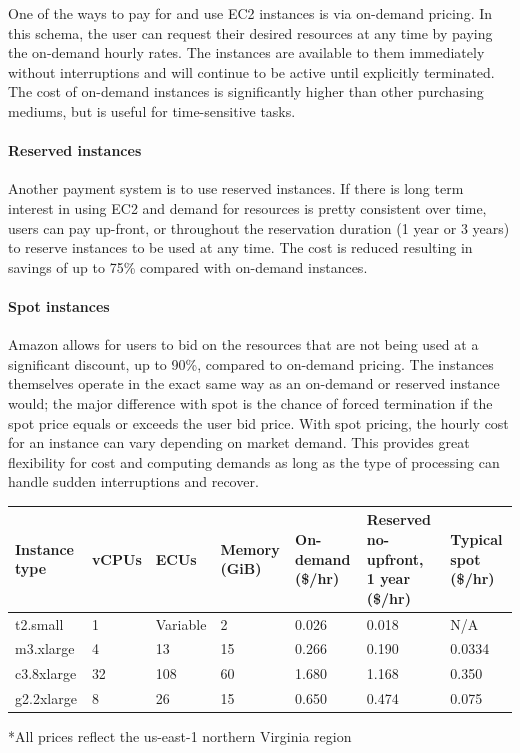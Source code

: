 \documentclass{frontiersSCNS} %
\begin{document}
One of the ways to pay for and use EC2 instances is via on-demand pricing. In this schema, the user can request their desired resources at any time by paying the on-demand hourly rates. The instances are available to them immediately without interruptions and will continue to be active until explicitly terminated. The cost of on-demand instances is significantly higher than other purchasing mediums, but is useful for time-sensitive tasks.

\paragraph{Reserved instances}

Another payment system is to use reserved instances. If there is long term interest in using EC2 and demand for resources is pretty consistent over time, users can pay up-front, or throughout the reservation duration (1 year or 3 years) to reserve instances to be used at any time. The cost is reduced resulting in savings of up to 75\% compared with on-demand instances.

\paragraph{Spot instances}

Amazon allows for users to bid on the resources that are not being used at a significant discount, up to 90\%, compared to on-demand pricing. The instances themselves operate in the exact same way as an on-demand or reserved instance would; the major difference with spot is the chance of forced termination if the spot price equals or exceeds the user bid price. With spot pricing, the hourly cost for an instance can vary depending on market demand. This provides great flexibility for cost and computing demands as long as the type of processing can handle sudden interruptions and recover.

\begin{table}[!t]

{\begin{tabular}{lllllll}\toprule
    Instance type & vCPUs & ECUs & Memory (GiB) & On-demand (\$/hr) & Reserved no-upfront, 1 year (\$/hr) & Typical spot (\$/hr)\\\midrule
    t2.small & 1 & Variable & 2 & 0.026 & 0.018 & N/A\\
    m3.xlarge & 4 & 13 & 15 & 0.266 & 0.190 & 0.0334\\
    c3.8xlarge & 32 & 108 & 60 & 1.680 & 1.168 & 0.350\\
    g2.2xlarge & 8 & 26 & 15 & 0.650 & 0.474 & 0.075
\end{tabular}}{*All prices reflect the us-east-1 northern Virginia region}
\end{table}
\end{document}
